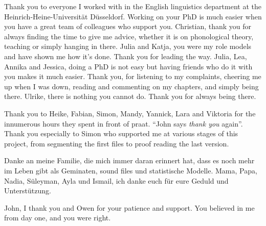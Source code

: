 Thank you to everyone I worked with in the English linguistics department at the Heinrich-Heine-Universität Düsseldorf. Working on your PhD is much easier when you have a great team of colleagues who support you. 
Christian, thank you for always finding the time to give me advice, whether it is on phonological theory, teaching or simply hanging in there. 
Julia and Katja, you were my role models and have shown me how it's done. Thank you for leading the way.
Julia, Lea, Annika and Jessica, doing a PhD is not easy but having friends who do it with you makes it much easier. Thank you, for listening to my complaints, cheering me up when I was down, reading  and commenting on my chapters, and simply being there.
Ulrike, there is nothing you cannot do. Thank you for always being there.

Thank you to Heike, Fabian, Simon, Mandy, Yannick, Lara and Viktoria for the innumerous hours they spent in front of praat. ``John says \textit{thank you} again''.  
Thank you especially to Simon who supported me at various stages of this project, from segmenting the first files to proof reading the last version.

Danke an meine Familie, die mich immer daran erinnert hat, dass es noch mehr im Leben gibt als Geminaten, sound files und statistische Modelle. Mama, Papa, Nadia, Süleyman, Ayla und Ismail, ich danke euch für eure Geduld und Unterstützung.

John, I thank you and Owen for your patience and support. You believed in me from day one, and you were right.





